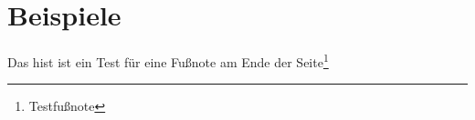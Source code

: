 \section{Beispiele}\label{sec:beispiele}

Das hist ist ein Test für eine Fußnote am Ende der Seite\footnote{Testfußnote}











